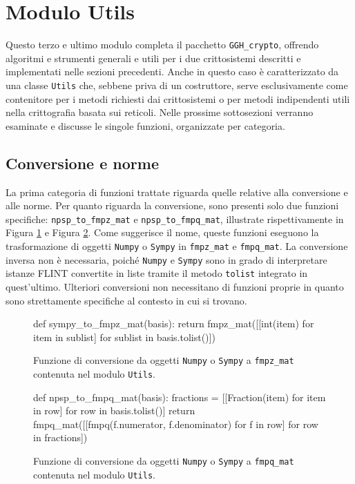 \section{Modulo Utils}
\label{sec:moduloutils}

Questo terzo e ultimo modulo completa il pacchetto \texttt{GGH\_crypto}, offrendo algoritmi 
e strumenti generali e utili per i due crittosistemi descritti e implementati nelle sezioni 
precedenti. 
Anche in questo caso è caratterizzato da una classe \texttt{Utils} che,
sebbene priva di un costruttore, serve esclusivamente come contenitore per i metodi 
richiesti dai crittosistemi o per metodi indipendenti utili nella crittografia basata 
sui reticoli. Nelle prossime sottosezioni verranno esaminate e discusse le singole
funzioni, organizzate per categoria. 

\subsection{Conversione e norme}

La prima categoria di funzioni trattate riguarda quelle relative alla conversione e 
alle norme. Per quanto riguarda la conversione, sono presenti solo due funzioni specifiche:  
\texttt{npsp\_to\_fmpz\_mat} e \texttt{npsp\_to\_fmpq\_mat}, illustrate rispettivamente in 
Figura \ref{fig:npsp_to_fmpz_mat} e Figura \ref{fig:npsp_to_fmpq_mat}.
Come suggerisce il nome, queste funzioni eseguono la trasformazione di 
oggetti \texttt{Numpy} o \texttt{Sympy} in \texttt{fmpz\_mat} e \texttt{fmpq\_mat}. 
La conversione inversa non è necessaria, poiché \texttt{Numpy} e \texttt{Sympy} sono
in grado di interpretare 
istanze FLINT convertite in liste tramite il metodo \texttt{tolist} integrato in quest'ultimo.
Ulteriori conversioni non necessitano di funzioni proprie in quanto sono strettamente 
specifiche al contesto in cui si trovano. 
\begin{figure}[h]
    \begin{python}
        def sympy_to_fmpz_mat(basis):
            return fmpz_mat([[int(item) for item in sublist] 
                    for sublist in basis.tolist()])
    \end{python}
    \caption{Funzione di conversione da oggetti \texttt{Numpy} o \texttt{Sympy} a 
    \texttt{fmpz\_mat} contenuta nel modulo \texttt{Utils}.}
    \label{fig:npsp_to_fmpz_mat}
\end{figure}

\begin{figure}[h]
    \begin{python}
        def npsp_to_fmpq_mat(basis):
            fractions = [[Fraction(item) for item in row] 
                                    for row in basis.tolist()]
            return fmpq_mat([[fmpq(f.numerator, f.denominator) 
                                for f in row] for row in fractions])
    \end{python}
    \caption{Funzione di conversione da oggetti \texttt{Numpy} o \texttt{Sympy} a 
    \texttt{fmpq\_mat} contenuta nel modulo \texttt{Utils}.}
    \label{fig:npsp_to_fmpq_mat}
\end{figure}

